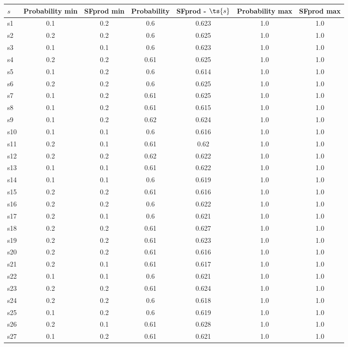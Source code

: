 \documentclass{article}
\begin{document}
\noindent\begin{tabular}{|l|c|c|c|c|c|c|}
\hline
$s$& Probability min & SFprod min & Probability & SFprod - $\ts{s}$ & Probability max & SFprod max\\
\hline
s1 &0.1 & 0.2 & 0.6 & 0.623 & 1.0 & 1.0\\
\hline
s2 &0.2 & 0.2 & 0.6 & 0.625 & 1.0 & 1.0\\
\hline
s3 &0.1 & 0.1 & 0.6 & 0.623 & 1.0 & 1.0\\
\hline
s4 &0.2 & 0.2 & 0.61 & 0.625 & 1.0 & 1.0\\
\hline
s5 &0.1 & 0.2 & 0.6 & 0.614 & 1.0 & 1.0\\
\hline
s6 &0.2 & 0.2 & 0.6 & 0.625 & 1.0 & 1.0\\
\hline
s7 &0.1 & 0.2 & 0.61 & 0.625 & 1.0 & 1.0\\
\hline
s8 &0.1 & 0.2 & 0.61 & 0.615 & 1.0 & 1.0\\
\hline
s9 &0.1 & 0.2 & 0.62 & 0.624 & 1.0 & 1.0\\
\hline
s10 &0.1 & 0.1 & 0.6 & 0.616 & 1.0 & 1.0\\
\hline
s11 &0.2 & 0.1 & 0.61 & 0.62 & 1.0 & 1.0\\
\hline
s12 &0.2 & 0.2 & 0.62 & 0.622 & 1.0 & 1.0\\
\hline
s13 &0.1 & 0.1 & 0.61 & 0.622 & 1.0 & 1.0\\
\hline
s14 &0.1 & 0.1 & 0.6 & 0.619 & 1.0 & 1.0\\
\hline
s15 &0.2 & 0.2 & 0.61 & 0.616 & 1.0 & 1.0\\
\hline
s16 &0.2 & 0.2 & 0.6 & 0.622 & 1.0 & 1.0\\
\hline
s17 &0.2 & 0.1 & 0.6 & 0.621 & 1.0 & 1.0\\
\hline
s18 &0.2 & 0.2 & 0.61 & 0.627 & 1.0 & 1.0\\
\hline
s19 &0.2 & 0.2 & 0.61 & 0.623 & 1.0 & 1.0\\
\hline
s20 &0.2 & 0.2 & 0.61 & 0.616 & 1.0 & 1.0\\
\hline
s21 &0.2 & 0.1 & 0.61 & 0.617 & 1.0 & 1.0\\
\hline
s22 &0.1 & 0.1 & 0.6 & 0.621 & 1.0 & 1.0\\
\hline
s23 &0.2 & 0.2 & 0.61 & 0.624 & 1.0 & 1.0\\
\hline
s24 &0.2 & 0.2 & 0.6 & 0.618 & 1.0 & 1.0\\
\hline
s25 &0.1 & 0.2 & 0.6 & 0.619 & 1.0 & 1.0\\
\hline
s26 &0.2 & 0.1 & 0.61 & 0.628 & 1.0 & 1.0\\
\hline
s27 &0.1 & 0.2 & 0.61 & 0.621 & 1.0 & 1.0\\

\end{tabular}
\end{document}
